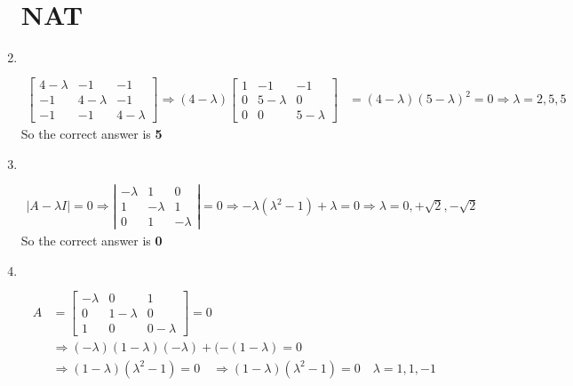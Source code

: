 \begin{enumerate}
	\section{NAT}
		\item $\left. \right. $	
	\begin{answer}
		\begin{align*}
		\left[\begin{array}{ccc}4-\lambda & -1 & -1 \\ -1 & 4-\lambda & -1 \\ -1 & -1 & 4-\lambda\end{array}\right] \Rightarrow(4-\lambda)\left[\begin{array}{ccc}1 & -1 & -1 \\ 0 & 5-\lambda & 0 \\ 0 & 0 & 5-\lambda\end{array}\right]&=(4-\lambda)(5-\lambda)^{2}=0 \Rightarrow \lambda=2,5,5
		\end{align*}
			So the correct answer is \textbf{5}
	\end{answer}
		\item $\left. \right. $	
	\begin{answer}
		\begin{align*}
		|A-\lambda I|=0 \Rightarrow\left|\begin{array}{ccc}-\lambda & 1 & 0 \\ 1 & -\lambda & 1 \\ 0 & 1 & -\lambda\end{array}\right|=0 \Rightarrow-\lambda\left(\lambda^{2}-1\right)+\lambda=0 \Rightarrow \lambda=0,+\sqrt{2},-\sqrt{2}
		\end{align*}
			So the correct answer is \textbf{0}
	\end{answer}
		\item $\left. \right. $	
	\begin{answer}
		\begin{align*}
		A&=\left[\begin{array}{ccc}-\lambda & 0 & 1 \\ 0 & 1-\lambda & 0 \\ 1 & 0 & 0-\lambda\end{array}\right]=0\\
		&\Rightarrow(-\lambda)(1-\lambda)(-\lambda)+(-(1-\lambda)=0\\
		&\Rightarrow(1-\lambda)\left(\lambda^{2}-1\right)=0 \quad \Rightarrow(1-\lambda)\left(\lambda^{2}-1\right)=0 \quad \lambda=1,1,-1
		\end{align*}

\end{answer}
\end{enumerate}
